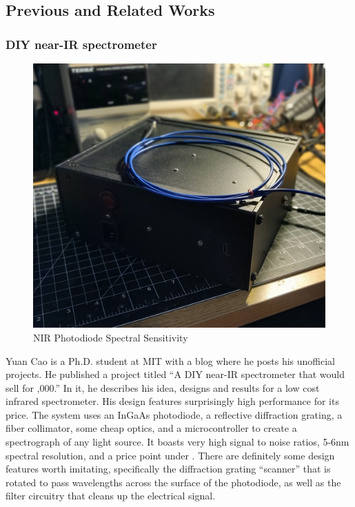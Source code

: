 \subsection{Previous and Related Works}

\subsubsection{DIY near-IR spectrometer}

\begin{figure}[H]
    \caption{NIR Photodiode Spectral Sensitivity}
    \centering
    \includegraphics[width=\textwidth]{images/3.1.1Pic.png}
\end{figure}

Yuan Cao is a Ph.D. student at MIT with a blog where he posts his unofficial projects. He published a project titled “A  DIY near-IR spectrometer that would sell for ,000.” In it, he describes his idea, designs and results for a low cost infrared spectrometer. His design features surprisingly high performance for its price. The system uses an InGaAs photodiode, a reflective diffraction grating, a fiber collimator, some cheap optics, and a microcontroller to create a spectrograph of any light source. It boasts very high signal to noise ratios, 5-6nm spectral resolution, and a price point under . There are definitely some design features worth imitating, specifically the diffraction grating “scanner” that is rotated to pass wavelengths across the surface of the photodiode, as well as the filter circuitry that cleans up the electrical signal. 

